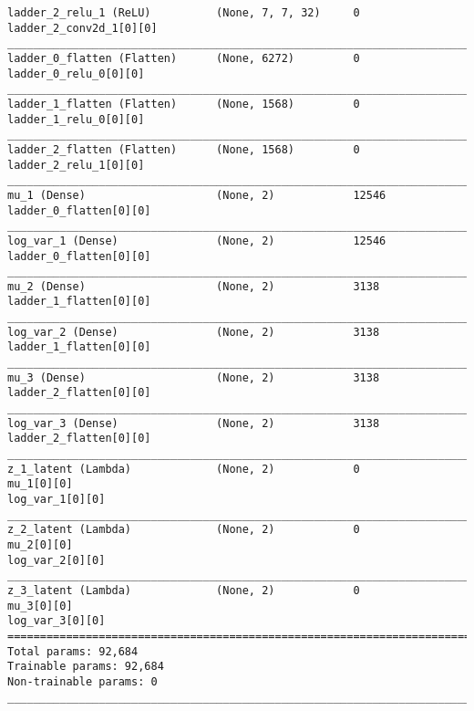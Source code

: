\begin{lstlisting}[caption={\textsc{Mnist}-\ac{VLAE}-factor-2 Encoder},captionpos=b,basicstyle=\tiny, label={lst:sparsity-vlae-encoder-28-fm2}]
ladder_2_relu_1 (ReLU)          (None, 7, 7, 32)     0           ladder_2_conv2d_1[0][0]
__________________________________________________________________________________________________
ladder_0_flatten (Flatten)      (None, 6272)         0           ladder_0_relu_0[0][0]
__________________________________________________________________________________________________
ladder_1_flatten (Flatten)      (None, 1568)         0           ladder_1_relu_0[0][0]
__________________________________________________________________________________________________
ladder_2_flatten (Flatten)      (None, 1568)         0           ladder_2_relu_1[0][0]
__________________________________________________________________________________________________
mu_1 (Dense)                    (None, 2)            12546       ladder_0_flatten[0][0]
__________________________________________________________________________________________________
log_var_1 (Dense)               (None, 2)            12546       ladder_0_flatten[0][0]
__________________________________________________________________________________________________
mu_2 (Dense)                    (None, 2)            3138        ladder_1_flatten[0][0]
__________________________________________________________________________________________________
log_var_2 (Dense)               (None, 2)            3138        ladder_1_flatten[0][0]
__________________________________________________________________________________________________
mu_3 (Dense)                    (None, 2)            3138        ladder_2_flatten[0][0]
__________________________________________________________________________________________________
log_var_3 (Dense)               (None, 2)            3138        ladder_2_flatten[0][0]
__________________________________________________________________________________________________
z_1_latent (Lambda)             (None, 2)            0           mu_1[0][0]
log_var_1[0][0]
__________________________________________________________________________________________________
z_2_latent (Lambda)             (None, 2)            0           mu_2[0][0]
log_var_2[0][0]
__________________________________________________________________________________________________
z_3_latent (Lambda)             (None, 2)            0           mu_3[0][0]
log_var_3[0][0]
==================================================================================================
Total params: 92,684
Trainable params: 92,684
Non-trainable params: 0
__________________________________________________________________________________________________
\end{lstlisting}